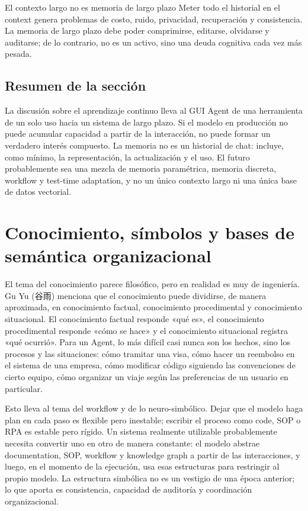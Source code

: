 \documentclass[a4paper]{article}
\begin{document}
\begin{warningbox}{El contexto largo no es memoria de largo plazo}
Meter todo el historial en el context genera problemas de costo, ruido, privacidad, recuperación y consistencia. La memoria de largo plazo debe poder comprimirse, editarse, olvidarse y auditarse; de lo contrario, no es un activo, sino una deuda cognitiva cada vez más pesada.
\end{warningbox}

\subsection{Resumen de la sección}

La discusión sobre el aprendizaje continuo lleva al GUI Agent de una herramienta de un solo uso hacia un sistema de largo plazo. Si el modelo en producción no puede acumular capacidad a partir de la interacción, no puede formar un verdadero interés compuesto. La memoria no es un historial de chat: incluye, como mínimo, la representación, la actualización y el uso. El futuro probablemente sea una mezcla de memoria paramétrica, memoria discreta, workflow y test-time adaptation, y no un único contexto largo ni una única base de datos vectorial.
\section{Conocimiento, símbolos y bases de semántica organizacional}

El tema del conocimiento parece filosófico, pero en realidad es muy de ingeniería. Gu Yu (谷雨) menciona que el conocimiento puede dividirse, de manera aproximada, en conocimiento factual, conocimiento procedimental y conocimiento situacional. El conocimiento factual responde «qué es», el conocimiento procedimental responde «cómo se hace» y el conocimiento situacional registra «qué ocurrió». Para un Agent, lo más difícil casi nunca son los hechos, sino los procesos y las situaciones: cómo tramitar una visa, cómo hacer un reembolso en el sistema de una empresa, cómo modificar código siguiendo las convenciones de cierto equipo, cómo organizar un viaje según las preferencias de un usuario en particular.

Esto lleva al tema del workflow y de lo neuro-simbólico. Dejar que el modelo haga plan en cada paso es flexible pero inestable; escribir el proceso como code, SOP o RPA es estable pero rígido. Un sistema realmente utilizable probablemente necesita convertir uno en otro de manera constante: el modelo abstrae documentation, SOP, workflow y knowledge graph a partir de las interacciones, y luego, en el momento de la ejecución, usa esas estructuras para restringir al propio modelo. La estructura simbólica no es un vestigio de una época anterior; lo que aporta es consistencia, capacidad de auditoría y coordinación organizacional.
\end{document}
